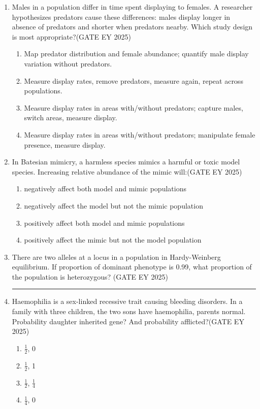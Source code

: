 \begin{enumerate}[leftmargin=*,label=\textbf{Q.\arabic*},resume]
\item Males in a population differ in time spent displaying to females. A researcher hypothesizes predators cause these differences: males display longer in absence of predators and shorter when predators nearby. Which study design is most appropriate?\hfill {(GATE EY 2025)}
\begin{multicols}{2}
\begin{enumerate}
\item Map predator distribution and female abundance; quantify male display variation without predators.
\item Measure display rates, remove predators, measure again, repeat across populations.
\item Measure display rates in areas with/without predators; capture males, switch areas, measure display.
\item Measure display rates in areas with/without predators; manipulate female presence, measure display.
\end{enumerate}
\end{multicols}

\item In Batesian mimicry, a harmless species mimics a harmful or toxic model species. Increasing relative abundance of the mimic will:\hfill {(GATE EY 2025)}
\begin{multicols}{2}
\begin{enumerate}
\item negatively affect both model and mimic populations
\item negatively affect the model but not the mimic population
\item positively affect both model and mimic populations
\item positively affect the mimic but not the model population
\end{enumerate}
\end{multicols}

\item There are two alleles at a locus in a population in Hardy-Weinberg equilibrium. If proportion of dominant phenotype is 0.99, what proportion of the population is heterozygous?
\hfill {(GATE EY 2025)}
\rule{4cm}{0.15mm}

\item Haemophilia is a sex-linked recessive trait causing bleeding disorders. In a family with three children, the two sons have haemophilia, parents normal. Probability daughter inherited gene? And probability afflicted?\hfill {(GATE EY 2025)}
\begin{multicols}{2}
\begin{enumerate}
\item $\frac{1}{2}$, 0
\item $\frac{1}{2}$, 1
\item $\frac{1}{2}$, $\frac{1}{4}$
\item $\frac{1}{4}$, 0
\end{enumerate}
\end{multicols}

\end{enumerate}

